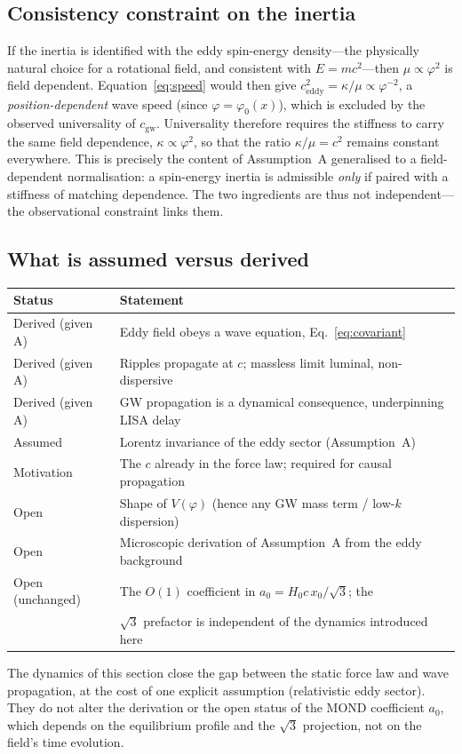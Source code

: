 \subsection{Consistency constraint on the inertia}

If the inertia is identified with the eddy spin-energy density---the physically natural
choice for a rotational field, and consistent with $E=mc^2$---then $\mu \propto \varphi^2$
is field dependent. Equation~\eqref{eq:speed} would then give
$c_\text{eddy}^2 = \kappa/\mu \propto \varphi^{-2}$, a \emph{position-dependent} wave
speed (since $\varphi=\varphi_0(x)$), which is excluded by the observed universality of
$c_\text{gw}$. Universality therefore requires the stiffness to carry the same field
dependence, $\kappa \propto \varphi^2$, so that the ratio $\kappa/\mu = c^2$ remains
constant everywhere. This is precisely the content of Assumption~A generalised to a
field-dependent normalisation: a spin-energy inertia is admissible \emph{only} if
paired with a stiffness of matching dependence. The two ingredients are thus not
independent---the observational constraint links them.

\subsection{What is assumed versus derived}

\begin{center}
\begin{tabular}{ll}
\toprule
Status & Statement \\
\midrule
Derived (given A) & Eddy field obeys a wave equation, Eq.~\eqref{eq:covariant} \\
Derived (given A) & Ripples propagate at $c$; massless limit luminal, non-dispersive \\
Derived (given A) & GW propagation is a dynamical consequence, underpinning LISA delay \\
\midrule
Assumed & Lorentz invariance of the eddy sector (Assumption~A) \\
Motivation & The $c$ already in the force law; required for causal propagation \\
\midrule
Open & Shape of $V(\varphi)$ (hence any GW mass term / low-$k$ dispersion) \\
Open & Microscopic derivation of Assumption~A from the eddy background \\
Open (unchanged) & The $O(1)$ coefficient in $a_0 = H_0 c\,x_0/\sqrt{3}$; the \\
                 & $\sqrt{3}$ prefactor is independent of the dynamics introduced here \\
\bottomrule
\end{tabular}
\end{center}

\noindent
The dynamics of this section close the gap between the static force law and
wave propagation, at the cost of one explicit assumption (relativistic eddy sector).
They do not alter the derivation or the open status of the MOND coefficient $a_0$,
which depends on the equilibrium profile and the $\sqrt{3}$ projection, not on the
field's time evolution.
